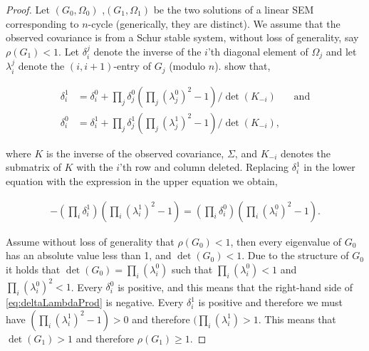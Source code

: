 \documentclass[accepted]{uai2021} %
\begin{document}
\begin{proof}
	Let $(G_0, \Omega_0)$ ,$(G_1, \Omega_1)$ be the two solutions of a linear 
	SEM corresponding to 
	$n$-cycle (generically, they are distinct). We assume that the observed 
	covariance is 
	from a Schur stable system, without loss of generality, say $\rho(G_1) < 
	1$. Let 
	$\delta_i^j$ denote the inverse of the $i$'th diagonal element of 
	$\Omega_j$ and let 
	$\lambda_i^j$ denote the $(i,i+1)$-entry of $G_j$ (modulo $n$). 
	\cite{drton2011} show that,
	
	\begin{align*}
	\delta_i^1 &= \delta_i^0 + \prod_j \delta_j^0 (\prod_j (\lambda_j^0)^2 - 
	1)/\det(K_{-i}) \ \ \ \ \ \ \ \  \text{and} \\
	\delta_i^0 &= \delta_i^1 + \prod_j \delta_j^1 (\prod_j (\lambda_j^1)^2 - 
	1)/\det(K_{-i}),
	\end{align*}
	
	\noindent where $K$ is the inverse of the observed covariance, $\Sigma$, 
	and $K_{-i}$ denotes the submatrix of $K$ with the $i$'th row and column 
	deleted. Replacing $\delta_i^1$ in the lower equation with the expression 
	in the upper equation we obtain, 
	
	\begin{align}
	- (\prod_i \delta_i^1) (\prod_i (\lambda_i^1)^2 - 
	1) = (\prod_i \delta_i^0) (\prod_i (\lambda_i^0)^2 - 
	1).
	\label{eq:deltaLambdaProd}
	\end{align}
	
	\noindent Assume without loss of generality that $\rho(G_0) < 1$, 
	then every eigenvalue of $G_0$ has an absolute value less than 1, and 
	$\det(G_0) < 1$. Due to the structure of $G_0$ it holds that 
	$\det(G_0) = \prod_i(\lambda_i^0)$ such that $\prod_i(\lambda_i^0) < 
	1$ 
	and $\prod_i(\lambda_i^0)^2 < 1$. Every $\delta_i^0$ is 
	positive, and this means that the right-hand side of 
	\ref{eq:deltaLambdaProd} is negative. Every $\delta_i^1$ is positive and 
	therefore we must have $(\prod_i 
	(\lambda_i^1)^2 - 
	1) > 0$ and therefore $(\prod_i 
	(\lambda_i^1) > 1$. This means that $\det(G_1) > 1$ and therefore 
	$\rho(G_1) \geq 1$.
\end{proof}




\end{document}
